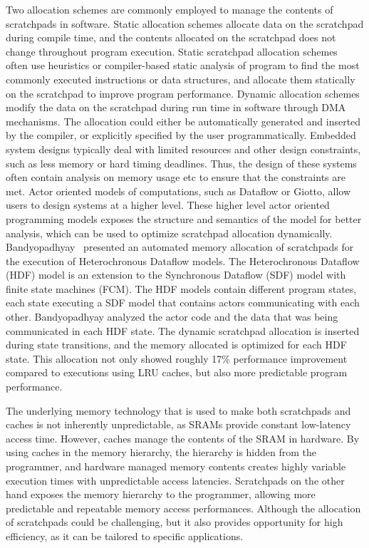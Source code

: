 Two allocation schemes are commonly employed to manage the contents of scratchpads in software.
Static allocation schemes allocate data on the scratchpad during compile time, and the contents allocated on the scratchpad does not change throughout program execution. 
Static scratchpad allocation schemes~\cite{Suhendra2005WCETSPM, Patel2008PRETSPM} often use heuristics or compiler-based static analysis of program to find the most commonly executed instructions or data structures, and allocate them statically on the scratchpad to improve program performance. 
Dynamic allocation schemes modify the data on the scratchpad during run time in software through DMA mechanisms.
The allocation could either be automatically generated and inserted by the compiler, or explicitly specified by the user programmatically.
Embedded system designs typically deal with limited resources and other design constraints, such as less memory or hard timing deadlines.    
Thus, the design of these systems often contain analysis on memory usage etc to ensure that the constraints are met. 
Actor oriented models of computations, such as Dataflow or Giotto, allow users to design systems at a higher level.
These higher level actor oriented programming models exposes the structure and semantics of the model for better analysis, which can be used to optimize scratchpad allocation dynamically.
Bandyopadhyay~\cite{Bandyopadhyay06_AutomatedMemoryAllocationOfActorCodeDataBufferInHeterochronous} presented an automated memory allocation of scratchpads for the execution of Heterochronous Dataflow models.
The Heterochronous Dataflow (HDF) model is an extension to the Synchronous Dataflow (SDF) model with finite state machines (FCM). 
The HDF models contain different program states, each state executing a SDF model that contains actors communicating with each other. 
Bandyopadhyay analyzed the actor code and the data that was being communicated in each HDF state.
The dynamic scratchpad allocation is inserted during state transitions, and the memory allocated is optimized for each HDF state. 
This allocation not only showed roughly 17\% performance improvement compared to executions using LRU caches, but also more predictable program performance.

The underlying memory technology that is used to make both scratchpads and caches is not inherently unpredictable, as SRAMs provide constant low-latency access time. 
However, caches manage the contents of the SRAM in hardware. 
By using caches in the memory hierarchy, the hierarchy is hidden from the programmer, and hardware managed memory contents creates highly variable execution times with unpredictable access latencies. 
Scratchpads on the other hand exposes the memory hierarchy to the programmer, allowing more predictable and repeatable memory access performances.
Although the allocation of scratchpads could be challenging, but it also provides opportunity for high efficiency, as it can be tailored to specific applications.   

